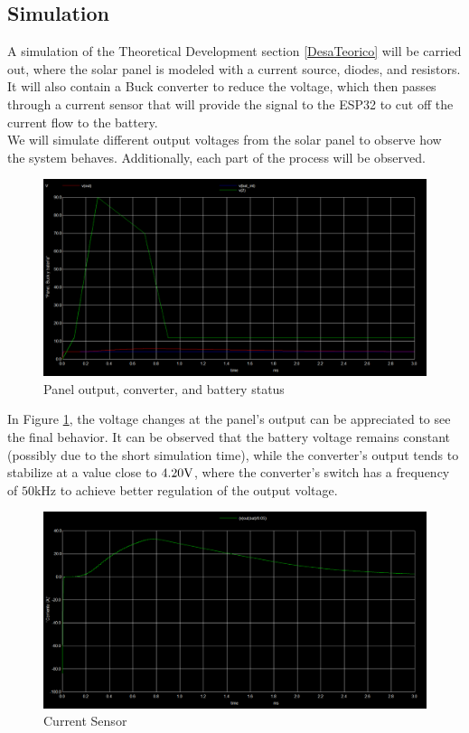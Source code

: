 \subsection{Simulation}

A simulation of the Theoretical Development section \ref{DesaTeorico} will be carried out, where the solar panel is modeled with a current source, diodes, and resistors. It will also contain a Buck converter to reduce the voltage, which then passes through a current sensor that will provide the signal to the ESP32 to cut off the current flow to the battery.\\

We will simulate different output voltages from the solar panel to observe how the system behaves. Additionally, each part of the process will be observed.

\begin{figure}[H]
    \centering
    \includegraphics[width=\textwidth]{image/image1}
    \caption{Panel output, converter, and battery status}\label{SIM1}
\end{figure}

In Figure \ref{SIM1}, the voltage changes at the panel's output can be appreciated to see the final behavior. It can be observed that the battery voltage remains constant (possibly due to the short simulation time), while the converter's output tends to stabilize at a value close to $4.20\volt$, where the converter's switch has a frequency of $50\si{\kHz}$ to achieve better regulation of the output voltage.

\begin{figure}[H]
    \centering
    \includegraphics[width=\textwidth]{image/image2}
    \caption{Current Sensor}\label{SIM2}
\end{figure}

